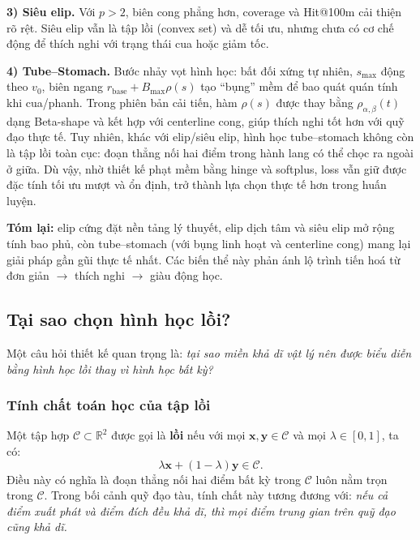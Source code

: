\documentclass{IEEEtran}
\newcommand{\R}{\mathbb{R}}
\begin{document}
\textbf{3) Siêu elip.}
Với $p>2$, biên cong phẳng hơn, coverage và Hit@100m cải thiện rõ rệt.
Siêu elip vẫn là tập lồi (convex set) và dễ tối ưu,
nhưng chưa có cơ chế động để thích nghi với trạng thái cua hoặc giảm tốc.

\textbf{4) Tube--Stomach.}
Bước nhảy vọt hình học: bất đối xứng tự nhiên, $s_{\max}$ động theo $v_0$,
biên ngang $r_{\text{base}}+B_{\max}\rho(s)$ tạo ``bụng'' mềm để bao quát quán tính khi cua/phanh.
Trong phiên bản cải tiến, hàm $\rho(s)$ được thay bằng $\rho_{\alpha,\beta}(t)$ dạng Beta-shape
và kết hợp với centerline cong, giúp thích nghi tốt hơn với quỹ đạo thực tế.
Tuy nhiên, khác với elip/siêu elip, hình học tube--stomach không còn là tập lồi toàn cục:
đoạn thẳng nối hai điểm trong hành lang có thể chọc ra ngoài ở giữa.
Dù vậy, nhờ thiết kế phạt mềm bằng hinge và softplus,
loss vẫn giữ được đặc tính tối ưu mượt và ổn định,
trở thành lựa chọn thực tế hơn trong huấn luyện.

\medskip
\noindent \textbf{Tóm lại:}
elip cứng đặt nền tảng lý thuyết,
elip dịch tâm và siêu elip mở rộng tính bao phủ,
còn tube--stomach (với bụng linh hoạt và centerline cong)
mang lại giải pháp gần gũi thực tế nhất.
Các biến thể này phản ánh lộ trình tiến hoá từ đơn giản $\to$ thích nghi $\to$ giàu động học.

\subsection{Tại sao chọn hình học lồi?}\label{sec:why-convex}

Một câu hỏi thiết kế quan trọng là: \textit{tại sao miền khả dĩ
vật lý nên được biểu diễn bằng hình học lồi thay vì hình học bất kỳ?}

\subsubsection{Tính chất toán học của tập lồi}
Một tập hợp $\mathcal{C} \subset \R^2$ được gọi là \textbf{lồi}
nếu với mọi $\mathbf{x}, \mathbf{y} \in \mathcal{C}$ và mọi
$\lambda \in [0,1]$, ta có:
\[
\lambda \mathbf{x} + (1-\lambda)\mathbf{y} \in \mathcal{C}.
\]
Điều này có nghĩa là đoạn thẳng nối hai điểm bất kỳ trong $\mathcal{C}$
luôn nằm trọn trong $\mathcal{C}$. Trong bối cảnh quỹ đạo tàu,
tính chất này tương đương với: \textit{nếu cả điểm xuất phát và
điểm đích đều khả dĩ, thì mọi điểm trung gian trên quỹ đạo cũng khả dĩ.}
\end{document}
